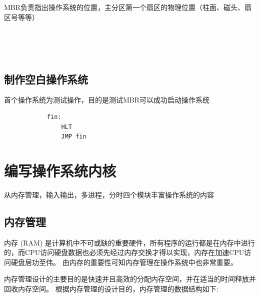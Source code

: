 \documentclass{swfcthesis}
\begin{document}
		MBR负责指出操作系统的位置，主分区第一个扇区的物理位置（柱面、磁头、扇区号等等）

		\begin{listing}[H]
		\inputminted[tabsize=2, firstline=6, lastline=6,
		linenos=true]{nasm}{../ZOS/src/kernel/ipl09.nas}
		\inputminted[tabsize=2, firstline=12, lastline=29,
		linenos=true]{nasm}{../ZOS/src/kernel/ipl09.nas}
		\end{listing}
		
		\inputminted[tabsize=2, firstline=43, lastline=45,
		linenos=true]{nasm}{../ZOS/src/kernel/ipl09.nas}
		
		\inputminted[tabsize=2, firstline=76, lastline=88,
		linenos=true]{nasm}{../ZOS/src/kernel/ipl09.nas}
	
	\begin{listing}[H]
		\inputminted[tabsize=2, firstline=125, lastline=147,
		linenos=true]{nasm}{../ZOS/src/kernel/ipl09.nas}
	\end{listing}

	\section{制作空白操作系统}

	首个操作系统为测试操作，目的是测试MBR可以成功启动操作系统

	\begin{verbatim}
			fin:
			    HLT
			    JMP fin
	\end{verbatim}
		
\chapter{编写操作系统内核}

	从内存管理，输入输出，多进程，分时四个模块丰富操作系统的内容

	\section{内存管理}

		内存 (RAM) 是计算机中不可或缺的重要硬件，所有程序的运行都是在内存中进行的，而CPU访问硬盘数据也必须先经过内存交换才得以实现，内存在加速CPU访问硬盘居功至伟。
		由内存的重要性可知内存管理在操作系统中也非常重要。	
		
		内存管理设计的主要目的是快速并且高效的分配内存空间，并在适当的时间释放并回收内存空间。
		根据内存管理的设计目的，内存管理的数据结构如下:

		\inputminted[tabsize=2, firstline=137, lastline=143,
		linenos=true]{c}{../ZOS/src/kernel/bootpack.h}
		
\end{document}
